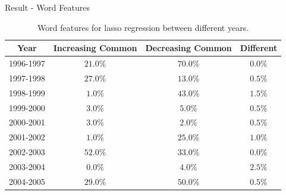 \documentclass{beamer}
\begin{document}
\begin{frame}{Result - Word Features}

  \begin{table}[H]
    \centering
    \begin{tabular}{|c|c|c|c|}
      \hline
      Year      & Increasing Common & Decreasing Common & Different \\
      \hline
      1996-1997 & $21.0\%$          & $70.0\%$          & $0.0\%$   \\
      \hline
      1997-1998 & $27.0\%$          & $13.0\%$          & $0.5\%$   \\
      \hline
      1998-1999 & $1.0\%$           & $43.0\%$          & $1.5\%$   \\
      \hline
      1999-2000 & $3.0\%$           & $5.0\%$           & $0.5\%$   \\
      \hline
      2000-2001 & $3.0\%$           & $2.0\%$           & $0.5\%$   \\
      \hline
      2001-2002 & $1.0\%$           & $25.0\%$          & $1.0\%$   \\
      \hline
      2002-2003 & $52.0\%$          & $33.0\%$          & $0.0\%$   \\
      \hline
      2003-2004 & $0.0\%$           & $4.0\%$           & $2.5\%$   \\
      \hline
      2004-2005 & $29.0\%$          & $50.0\%$          & $0.5\%$   \\
      \hline
    \end{tabular}
    \caption{Word features for lasso regression between different years.}
  \end{table}

\end{frame}
\end{document}
